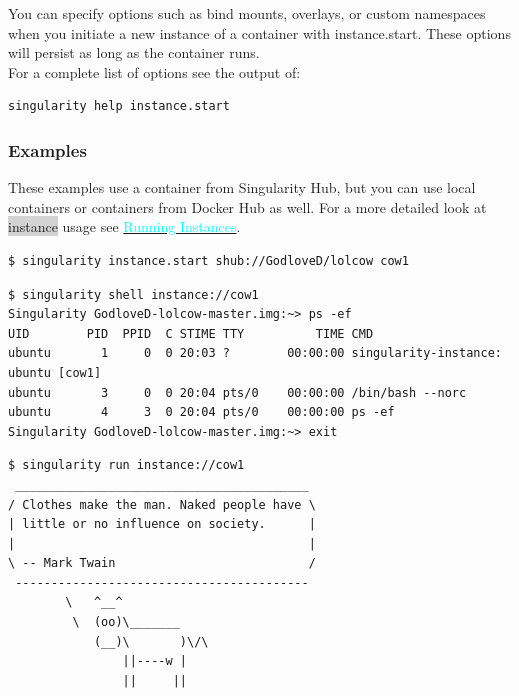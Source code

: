 \documentclass[a4paper]{article}
\newcounter{subsubsubsection}[subsubsection]
\begin{document}
You can specify options such as bind mounts, overlays, or custom namespaces when you initiate a new instance of a container with instance.start. These options will persist as long as the container runs.\\[0.1in]
For a complete list of options see the output of:
\begin{lstlisting}[frame=single]
singularity help instance.start
\end{lstlisting}
\subsubsection{Examples}

These examples use a container from Singularity Hub, but you can use local containers or containers from Docker Hub as well. For a more detailed look at \colorbox{lightgray}{instance} usage see \hyperref[sec:instances]{{\textcolor{cyan}{Running Instances}}}.

	
\begin{lstlisting}[frame=single]
$ singularity instance.start shub://GodloveD/lolcow cow1
\end{lstlisting}


		
\begin{lstlisting}[frame=single]
$ singularity shell instance://cow1
Singularity GodloveD-lolcow-master.img:~> ps -ef 
UID        PID  PPID  C STIME TTY          TIME CMD
ubuntu       1     0  0 20:03 ?        00:00:00 singularity-instance: ubuntu [cow1]
ubuntu       3     0  0 20:04 pts/0    00:00:00 /bin/bash --norc
ubuntu       4     3  0 20:04 pts/0    00:00:00 ps -ef
Singularity GodloveD-lolcow-master.img:~> exit
\end{lstlisting}
	
\begin{lstlisting}[frame=single]
$ singularity run instance://cow1
 _________________________________________
/ Clothes make the man. Naked people have \
| little or no influence on society.      |
|                                         |
\ -- Mark Twain                           /
 -----------------------------------------
        \   ^__^
         \  (oo)\_______
            (__)\       )\/\
                ||----w |
                ||     ||
\end{lstlisting}
	
\end{document}
